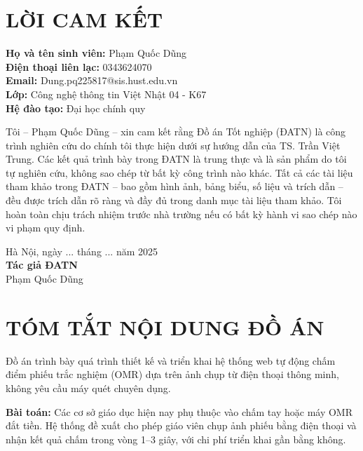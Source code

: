 \chapter*{LỜI CAM KẾT}
\begin{flushleft}
    \textbf{Họ và tên sinh viên:} Phạm Quốc Dũng \\
    \textbf{Điện thoại liên lạc:} 0343624070 \\
    \textbf{Email:} Dung.pq225817@sis.hust.edu.vn \\
    \textbf{Lớp:} Công nghệ thông tin Việt Nhật 04 - K67 \\
    \textbf{Hệ đào tạo:} Đại học chính quy
\end{flushleft}
\vspace{0.5cm}
Tôi – Phạm Quốc Dũng – xin cam kết rằng Đồ án Tốt nghiệp (ĐATN) là công trình nghiên cứu do chính tôi thực hiện dưới sự hướng dẫn của TS. Trần Việt Trung. Các kết quả trình bày trong ĐATN là trung thực và là sản phẩm do tôi tự nghiên cứu, không sao chép từ bất kỳ công trình nào khác. Tất cả các tài liệu tham khảo trong ĐATN – bao gồm hình ảnh, bảng biểu, số liệu và trích dẫn – đều được trích dẫn rõ ràng và đầy đủ trong danh mục tài liệu tham khảo. Tôi hoàn toàn chịu trách nhiệm trước nhà trường nếu có bất kỳ hành vi sao chép nào vi phạm quy định.

\begin{flushright}
    \begin{minipage}{7cm}
        \centering
        Hà Nội, ngày ... tháng ... năm 2025 \\
        \vspace{0.5cm}
        \textbf{Tác giả ĐATN} \\
        \vspace{1.2cm}
        Phạm Quốc Dũng
    \end{minipage}
\end{flushright}
\clearpage
\chapter*{TÓM TẮT NỘI DUNG ĐỒ ÁN}

Đồ án trình bày quá trình thiết kế và triển khai hệ thống web tự động chấm điểm phiếu trắc nghiệm (OMR) dựa trên ảnh chụp từ điện thoại thông minh, không yêu cầu máy quét chuyên dụng.

\textbf{Bài toán:} Các cơ sở giáo dục hiện nay phụ thuộc vào chấm tay hoặc máy OMR đắt tiền. Hệ thống đề xuất cho phép giáo viên chụp ảnh phiếu bằng điện thoại và nhận kết quả chấm trong vòng 1--3 giây, với chi phí triển khai gần bằng không.

